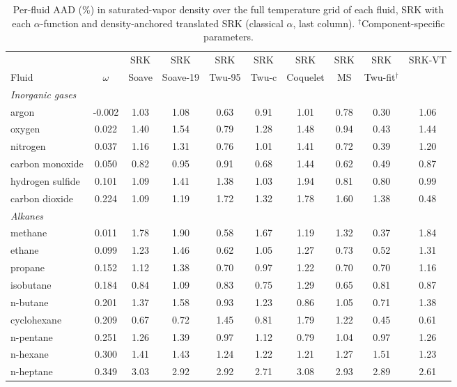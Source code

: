 \begin{table}[H]
\centering
\caption{Per-fluid AAD (\%) in saturated-vapor density over the full temperature grid of each fluid, SRK with each $\alpha$-function and density-anchored translated SRK (classical $\alpha$, last column). $^{\dagger}$Component-specific parameters.}
\label{tab:tabS_perfluid_rhov_srk}
\small
\begin{tabular}{lccccccccc}
\toprule
 &  & SRK & SRK & SRK & SRK & SRK & SRK & SRK & SRK-VT \\
Fluid & $\omega$ & Soave & Soave-19 & Twu-95 & Twu-c & Coquelet & MS & Twu-fit$^{\dagger}$ &  \\
\midrule
\multicolumn{10}{l}{\emph{Inorganic gases}} \\
argon & -0.002 & 1.03 & 1.08 & 0.63 & 0.91 & 1.01 & 0.78 & 0.30 & 1.06 \\
oxygen & 0.022 & 1.40 & 1.54 & 0.79 & 1.28 & 1.48 & 0.94 & 0.43 & 1.44 \\
nitrogen & 0.037 & 1.16 & 1.31 & 0.76 & 1.01 & 1.41 & 0.72 & 0.39 & 1.20 \\
carbon monoxide & 0.050 & 0.82 & 0.95 & 0.91 & 0.68 & 1.44 & 0.62 & 0.49 & 0.87 \\
hydrogen sulfide & 0.101 & 1.09 & 1.41 & 1.38 & 1.03 & 1.94 & 0.81 & 0.80 & 0.99 \\
carbon dioxide & 0.224 & 1.09 & 1.19 & 1.72 & 1.32 & 1.78 & 1.60 & 1.38 & 0.48 \\
\multicolumn{10}{l}{\emph{Alkanes}} \\
methane & 0.011 & 1.78 & 1.90 & 0.58 & 1.67 & 1.19 & 1.32 & 0.37 & 1.84 \\
ethane & 0.099 & 1.23 & 1.46 & 0.62 & 1.05 & 1.27 & 0.73 & 0.52 & 1.31 \\
propane & 0.152 & 1.12 & 1.38 & 0.70 & 0.97 & 1.22 & 0.70 & 0.70 & 1.16 \\
isobutane & 0.184 & 0.84 & 1.09 & 0.83 & 0.75 & 1.29 & 0.65 & 0.81 & 0.87 \\
n-butane & 0.201 & 1.37 & 1.58 & 0.93 & 1.23 & 0.86 & 1.05 & 0.71 & 1.38 \\
cyclohexane & 0.209 & 0.67 & 0.72 & 1.45 & 0.81 & 1.79 & 1.22 & 0.45 & 0.61 \\
n-pentane & 0.251 & 1.26 & 1.39 & 0.97 & 1.12 & 0.79 & 1.04 & 0.97 & 1.26 \\
n-hexane & 0.300 & 1.41 & 1.43 & 1.24 & 1.22 & 1.21 & 1.27 & 1.51 & 1.23 \\
n-heptane & 0.349 & 3.03 & 2.92 & 2.92 & 2.71 & 3.08 & 2.93 & 2.89 & 2.61 \\

\end{tabular}
\end{table}
